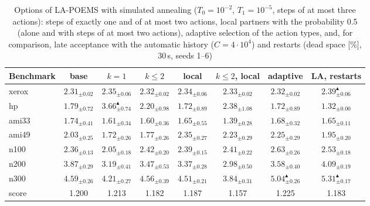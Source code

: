 \begin{table}
\centering
\footnotesize
\setlength{\tabcolsep}{4pt}
\begin{tabular}{@{}lccccccc@{}}
\toprule
Benchmark & base & $k = 1$ & $k \leq 2$ & local & $k \leq 2$, local & adaptive & LA, restarts \\
\midrule
xerox & $2.31_{\pm 0.02}$ & $2.35_{\pm 0.06}$ & $2.32_{\pm 0.02}$ & $2.34_{\pm 0.06}$ & $2.33_{\pm 0.02}$ & $2.32_{\pm 0.02}$ & $2.39_{\pm 0.06}^{\blacktriangle}$ \\
hp & $1.79_{\pm 0.72}$ & $3.66_{\pm 0.74}^{\blacktriangle}$ & $2.20_{\pm 0.98}$ & $1.72_{\pm 0.89}$ & $2.38_{\pm 1.08}$ & $1.72_{\pm 0.89}$ & $1.32_{\pm 0.00}$ \\
ami33 & $1.74_{\pm 0.41}$ & $1.61_{\pm 0.34}$ & $1.60_{\pm 0.36}$ & $1.65_{\pm 0.55}$ & $1.39_{\pm 0.28}$ & $1.68_{\pm 0.32}$ & $1.65_{\pm 0.11}$ \\
ami49 & $2.03_{\pm 0.25}$ & $1.72_{\pm 0.26}$ & $1.77_{\pm 0.26}$ & $2.35_{\pm 0.27}$ & $2.23_{\pm 0.29}$ & $2.25_{\pm 0.29}$ & $1.95_{\pm 0.20}$ \\
n100 & $2.36_{\pm 0.13}$ & $\mathbf{2.05_{\pm 0.18}}$ & $2.42_{\pm 0.20}$ & $2.39_{\pm 0.15}$ & $2.41_{\pm 0.22}$ & $2.63_{\pm 0.26}$ & $2.53_{\pm 0.18}$ \\
n200 & $3.87_{\pm 0.29}$ & $\mathbf{3.19_{\pm 0.41}}$ & $3.47_{\pm 0.53}$ & $\mathbf{3.37_{\pm 0.28}}$ & $\mathbf{2.98_{\pm 0.50}}$ & $3.58_{\pm 0.40}$ & $4.09_{\pm 0.19}$ \\
n300 & $4.59_{\pm 0.26}$ & $4.21_{\pm 0.27}$ & $4.56_{\pm 0.39}$ & $4.51_{\pm 0.21}$ & $\mathbf{3.84_{\pm 0.31}}$ & $5.04_{\pm 0.26}^{\blacktriangle}$ & $5.31_{\pm 0.17}^{\blacktriangle}$ \\
\midrule
score & 1.200 & 1.213 & 1.182 & 1.187 & 1.157 & 1.225 & 1.183 \\
\bottomrule
\end{tabular}
\caption{Options of LA-POEMS with simulated annealing ($T_0 = 10^{-2}$, $T_1 = 10^{-5}$, steps of at most three actions): steps of exactly one and of at most two actions, local partners with the probability 0.5 (alone and with steps of at most two actions), adaptive selection of the action types, and, for comparison, late acceptance with the automatic history ($C = 4 \cdot 10^4$) and restarts (dead space [\%], 30\,s, seeds 1--6)}
\label{tab:rq3sa}
\end{table}
